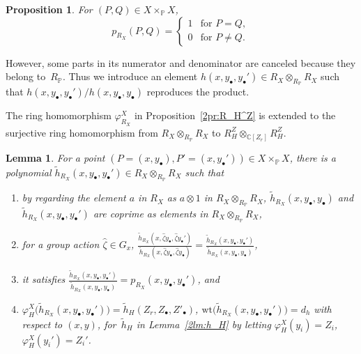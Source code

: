 \documentclass[pdftex]{sigma}
\def\CC{{\mathbb C}}
\def\PP{{\mathbb P}}
\def\th{{\widetilde h}}
\def\hzeta{{\widehat \zeta}}
\def\wt{{\mathrm {wt}}}
\numberwithin{equation}{section}
\newtheorem{Lemma}[Theorem]{Lemma}
\newtheorem{Proposition}[Theorem]{Proposition}
 { \theoremstyle{definition}
\newtheorem{Definition}[Theorem]{Definition}
\newtheorem{Note}[Theorem]{Note}
\newtheorem{Example}[Theorem]{Example}
\newtheorem{Remark}[Theorem]{Remark} }
\begin{document}
\begin{Proposition}\label{2pr:p_varpi0}
For $(P,Q) \in X \times_\PP X$,
\[
p_{R_X}(P,Q)=
\begin{cases}
1 & \text{for } P = Q,\\
0 & \text{for } P \neq Q.
\end{cases}
\]
\end{Proposition}

However, some parts in its numerator and denominator are canceled because they belong to~$R_\PP$.
Thus we introduce an element $h(x, y_\bullet, y_\bullet') \in R_X\otimes_{R_\PP} R_X$ such that $h(x, y_\bullet, y_\bullet') /h(x, y_\bullet, y_\bullet)$
reproduces the product.

The ring homomorphism $\varphi^X_{R_X}$ in Proposition~\ref{2pr:R_H^Z} is extended to the surjective ring homomorphism from $R_X\otimes_{R_\PP}R_X$ to $R_H^Z\otimes_{\CC[Z_r]}R_H^Z$.

\begin{Lemma}\label{2lm:h_RXe}
For a point $(P = (x, y_\bullet), P'=(x, y_\bullet'))\in X \times_\PP X$, there is a polynomial $\th_{R_X}(x, y_{\bullet}, y_{\bullet}')\in R_X \otimes_{R_\PP} R_X$ such that
\begin{enumerate}\itemsep=0pt
\item[$(1)$] by regarding the element $a$ in $R_X$ as
$a\otimes 1$ in $R_X \otimes_{R_\PP} R_X$,
$\th_{R_X}(x, y_{\bullet}, y_{\bullet})$ and
$\th_{R_X}(x, y_{\bullet}, y_{\bullet}')$ are coprime
as elements in $R_X \otimes_{R_\PP} R_X$,

\item[$(2)$] for a group action $\hzeta \in G_x$,
$ \frac{\th_{R_X}(x, \hzeta y_{\bullet}, \hzeta y_{\bullet}')}
{\th_{R_X}(x, \hzeta y_{\bullet}, \hzeta y_{\bullet})}=
 \frac{\th_{R_X}(x, y_{\bullet}, y_{\bullet}')}
{\th_{R_X}(x, y_{\bullet}, y_{\bullet})}$,

\item[$(3)$] it satisfies
$\frac{\th_{R_X}(x, y_{\bullet}, y_{\bullet}')}
{\th_{R_X}(x, y_{\bullet}, y_{\bullet})}=
p_{R_X}(x, y_{\bullet}, y_{\bullet}')$, and

\item[$(4)$]
$\varphi_H^X\big(\th_{R_X}(x, y_{\bullet}, y_{\bullet}')\big)
=\th_H(Z_r, Z_\bullet, Z'_\bullet)
$, $\wt\big(\th_{R_X}(x, y_{\bullet}, y_{\bullet}')\big)=d_h$
with respect to $(x,y)$,
for~$\th_{H}$ in Lemma~{\rm \ref{2lm:h_H}}
by letting $\varphi_H^X(y_i) =Z_i$, $\varphi_H^X(y_i') =Z_i'$.
\end{enumerate}
\end{Lemma}
\end{document}
